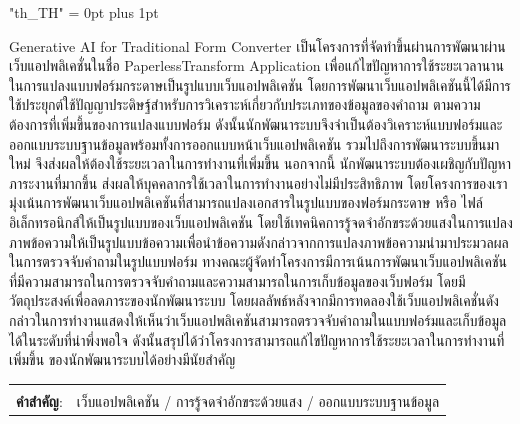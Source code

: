 \documentclass[12pt,oneside,openright,a4paper]{cpe-english-project}
\begin{document}
{
\XeTeXlinebreaklocale "th_TH"	
\XeTeXlinebreakskip = 0pt plus 1pt
\thaifont
\thaiabstract

Generative AI for Traditional Form Converter เป็นโครงการที่จัดทำขึ้นผ่านการพัฒนาผ่านเว็บแอปพลิเคชั่นในชื่อ PaperlessTransform Application
เพื่อแก้ไขปัญหาการใช้ระยะเวลานานในการแปลงแบบฟอร์มกระดาษเป็นรูปแบบเว็บแอปพลิเคชัน โดยการพัฒนาเว็บแอปพลิเคชันนี้ได้มีการใช้ประยุกต์ใช้ปัญญาประดิษฐ์สำหรับการวิเคราะห์เกี่ยวกับประเภทของข้อมูลของคำถาม 
ตามความต้องการที่เพิ่มขึ้นของการแปลงแบบฟอร์ม ดังนั้นนักพัฒนาระบบจึงจำเป็นต้องวิเคราะห์แบบฟอร์มและออกแบบระบบฐานข้อมูลพร้อมทั้งการออกแบบหน้าเว็บแอปพลิเคชัน รวมไปถึงการพัฒนาระบบขึ้นมาใหม่
จึงส่งผลให้ต้องใช้ระยะเวลาในการทำงานที่เพิ่มขึ้น นอกจากนี้ นักพัฒนาระบบต้องเผชิญกับปัญหาภาระงานที่มากขึ้น ส่งผลให้บุคคลากรใช้เวลาในการทำงานอย่างไม่มีประสิทธิภาพ 
โดยโครงการของเรามุ่งเน้นการพัฒนาเว็บแอปพลิเคชันที่สามารถแปลงเอกสารในรูปแบบของฟอร์มกระดาษ หรือ ไฟล์อิเล็กทรอนิกส์ให้เป็นรูปแบบของเว็บแอปพลิเคชัน 
โดยใช้เทคนิคการรู้จดจำอักขระด้วยแสงในการแปลงภาพข้อความให้เป็นรูปแบบข้อความเพื่อนำข้อความดังกล่าวจากการแปลงภาพข้อความนำมาประมวลผลในการตรวจจับคำถามในรูปแบบฟอร์ม 
ทางคณะผู้จัดทำโครงการมีการเน้นการพัฒนาเว็บแอปพลิเคชันที่มีความสามารถในการตรวจจับคำถามและความสามารถในการเก็บข้อมูลของเว็บฟอร์ม 
โดยมีวัตถุประสงค์เพื่อลดภาระของนักพัฒนาระบบ โดยผลลัพธ์หลังจากมีการทดลองใช้เว็บแอปพลิเคชั่นดังกล่าวในการทำงานแสดงให้เห็นว่าเว็บแอปพลิเคชันสามารถตรวจจับคำถามในแบบฟอร์มและเก็บข้อมูลได้ในระดับที่น่าพึ่งพอใจ ดังนั้นสรุปได้ว่าโครงการสามารถแก้ไขปัญหาการใช้ระยะเวลาในการทำงานที่เพิ่มขึ้น ของนักพัฒนาระบบได้อย่างมีนัยสำคัญ

\begin{flushleft}
\begin{tabular*}{\textwidth}{@{}lp{}}
 & \\

\textbf{คำสำคัญ}: & เว็บแอปพลิเคชัน / การรู้จดจำอักขระด้วยแสง /  ออกแบบระบบฐานข้อมูล
\end{tabular*}
\end{flushleft}
\endabstract
}
\end{document}
